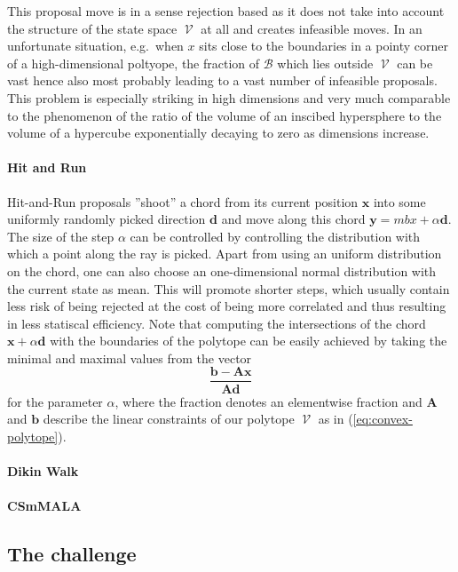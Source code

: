 \documentclass[10pt]{article}
\newcommand{\eg}{e.g.~}
\newcommand{\mb}[1]{\mathbf{#1}}
\DeclareMathOperator\fp{\mathcal{V}}
\begin{document}
This proposal move is in a sense rejection based as it does not take into account the structure
of the state space $\fp$ at all and creates infeasible moves.
In an unfortunate situation, \eg when $x$ sits close to the boundaries in a pointy corner of a high-dimensional
poltyope, the fraction of $\mathcal{B}$ which lies outside $\fp$ can be vast hence also most probably leading 
to a vast number of infeasible proposals.
This problem is especially striking in high dimensions and very much comparable to the phenomenon of the 
ratio of the volume of an inscibed hypersphere to the volume of a hypercube exponentially decaying to zero
as dimensions increase.

\paragraph{Hit and Run}

Hit-and-Run proposals ''shoot'' a chord from its current position $\mb{x}$ into some uniformly randomly picked 
direction $\mb{d}$ and move along this chord $\mb{y} = mb{x} + \alpha\mb{d}$.
The size of the step $\alpha$ can be controlled by controlling the distribution with which a point along the ray is picked.
Apart from using an uniform distribution on the chord, one can also choose an one-dimensional normal distribution with 
the current state as mean.
This will promote shorter steps, which usually contain less risk of being rejected at the cost of being more
correlated and thus resulting in less statiscal efficiency.
Note that computing the intersections of the chord $\mb{x} + \alpha \mb{d}$ with the boundaries of the polytope
can be easily achieved by taking the minimal and maximal values from the vector
\[
    \frac{\mb{b} - \mb{A}\mb{x}}{\mb{A}\mb{d}}
\]
for the parameter $\alpha$, where the fraction denotes an elementwise fraction and $\mb{A}$ and $\mb{b}$ 
describe the linear constraints of our polytope $\fp$ as in (\ref{eq:convex-polytope}).

\paragraph{Dikin Walk}



\paragraph{CSmMALA}

\subsection{The challenge}
\end{document}
